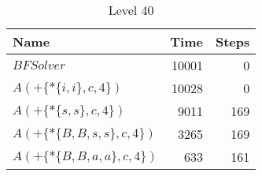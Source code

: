 \begin{table} \centering \begin{tabular}{lrr}\toprule \textbf{ Name }
    & \textbf{ Time } & \textbf{ Steps }\\\midrule
    $BFSolver$ & 10001 & 0 \\
    $A(+\{*\{i,i\},c,4\})$ & 10028 & 0 \\
    $A(+\{*\{s,s\},c,4\})$ & 9011 & 169 \\
    $A(+\{*\{B,B,s,s\},c,4\})$ & 3265 & 169 \\
    $A(+\{*\{B,B,a,a\},c,4\})$ & 633 & 161 \\
    \bottomrule \end{tabular} \caption{Level 40}
  \label{tab:level_40} \end{table}

